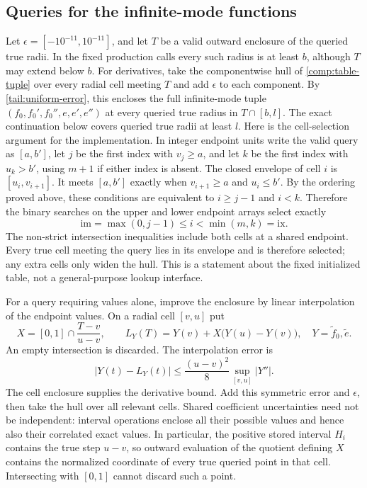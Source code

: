 \subsection{Queries for the infinite-mode functions}
\label{comp:lookup}

Let $\epsilon=[-10^{-11},10^{-11}]$, and let $T$ be a valid outward
enclosure of the queried true radii.  In the fixed production calls
every such radius is at least $b$, although $T$ may extend below $b$.
For derivatives, take the componentwise hull of
\eqref{comp:table-tuple} over every radial cell meeting $T$ and add
$\epsilon$ to each component.  By \eqref{tail:uniform-error}, this
encloses the full infinite-mode tuple $(f_0,f_0',f_0'',e,e',e'')$
at every queried true radius in $T\cap[b,l]$.  The exact continuation
below covers queried true radii at least $l$.
Here is the cell-selection argument for the implementation.  In
integer endpoint units write the valid query as $[a,b']$, let $j$ be
the first index with $v_j\ge a$, and let $k$ be the first index with
$u_k>b'$, using $m+1$ if either index is absent.  The closed envelope
of cell $i$ is $[u_i,v_{i+1}]$.  It meets $[a,b']$ exactly when
$v_{i+1}\ge a$ and $u_i\le b'$.  By the ordering proved above, these
conditions are equivalent to $i\ge j-1$ and $i<k$.  Therefore the
binary searches on the upper and lower endpoint arrays select exactly
\[
 \mathrm{im}=\max(0,j-1)\le i<\min(m,k)=\mathrm{ix}.
\]
The non-strict intersection inequalities include both cells at a
shared endpoint.  Every true cell meeting the query lies in its
envelope and is therefore selected; any extra cells only widen the
hull.  This is a statement about the fixed initialized table, not a
general-purpose lookup interface.

For a query requiring values alone, improve the enclosure by linear
interpolation of the endpoint values.  On a radial cell $[v,u]$ put
\[
 X=[0,1]\cap\frac{T-v}{u-v},\qquad
 L_Y(T)=Y(v)+X\bigl(Y(u)-Y(v)\bigr),
 \quad Y=\widetilde f_0,\widetilde e.
\]
An empty intersection is discarded.  The interpolation error is
\begin{equation}\label{comp:radial-interpolation}
 |Y(t)-L_Y(t)|\le\frac{(u-v)^2}{8}
                                   \sup_{[v,u]}|Y''|.
\end{equation}
The cell enclosure supplies the derivative bound.  Add this
symmetric error and $\epsilon$, then take the hull over all relevant
cells.  Shared coefficient uncertainties need not be independent:
interval operations enclose all their possible values and hence
also their correlated exact values.
In particular, the positive stored interval $H_i$ contains the true
step $u-v$, so outward evaluation of the quotient defining $X$
contains the normalized coordinate of every true queried point in
that cell.  Intersecting with $[0,1]$ cannot discard such a point.

